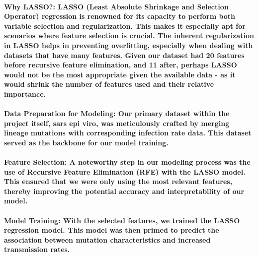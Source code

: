 \documentclass{article}
\begin{document}
\paragraph{\textbf{Why LASSO?}: LASSO (Least Absolute Shrinkage and Selection Operator) regression is renowned for its capacity to perform both variable selection and regularization. This makes it especially apt for scenarios where feature selection is crucial. The inherent regularization in LASSO helps in preventing overfitting, especially when dealing with datasets that have many features. Given our dataset had 20 features before recursive feature elimination, and 11 after, perhaps LASSO would not be the most appropriate given the available data - as it would shrink the number of features used and their relative importance.}
\paragraph{\textbf{}}
\paragraph{\textbf{Data Preparation for Modeling}: Our primary dataset within the project itself, sars epi viro, was meticulously crafted by merging lineage mutations with corresponding infection rate data. This dataset served as the backbone for our model training.}
\paragraph{\textbf{}}
\paragraph{\textbf{Feature Selection}: A noteworthy step in our modeling process was the use of Recursive Feature Elimination (RFE) with the LASSO model. This ensured that we were only using the most relevant features, thereby improving the potential accuracy and interpretability of our model.}
\paragraph{\textbf{}}
\paragraph{\textbf{Model Training}: With the selected features, we trained the LASSO regression model. This model was then primed to predict the association between mutation characteristics and increased transmission rates.}
\end{document}
